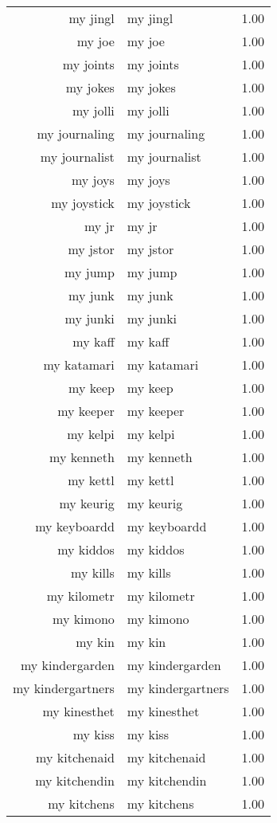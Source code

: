\begin{table}[ht]
\begin{tabular}{rlr}
  my jingl & my jingl & 1.00 \\ 
  my joe & my joe & 1.00 \\ 
  my joints & my joints & 1.00 \\ 
  my jokes & my jokes & 1.00 \\ 
  my jolli & my jolli & 1.00 \\ 
  my journaling & my journaling & 1.00 \\ 
  my journalist & my journalist & 1.00 \\ 
  my joys & my joys & 1.00 \\ 
  my joystick & my joystick & 1.00 \\ 
  my jr & my jr & 1.00 \\ 
  my jstor & my jstor & 1.00 \\ 
  my jump & my jump & 1.00 \\ 
  my junk & my junk & 1.00 \\ 
  my junki & my junki & 1.00 \\ 
  my kaff & my kaff & 1.00 \\ 
  my katamari & my katamari & 1.00 \\ 
  my keep & my keep & 1.00 \\ 
  my keeper & my keeper & 1.00 \\ 
  my kelpi & my kelpi & 1.00 \\ 
  my kenneth & my kenneth & 1.00 \\ 
  my kettl & my kettl & 1.00 \\ 
  my keurig & my keurig & 1.00 \\ 
  my keyboardd & my keyboardd & 1.00 \\ 
  my kiddos & my kiddos & 1.00 \\ 
  my kills & my kills & 1.00 \\ 
  my kilometr & my kilometr & 1.00 \\ 
  my kimono & my kimono & 1.00 \\ 
  my kin & my kin & 1.00 \\ 
  my kindergarden & my kindergarden & 1.00 \\ 
  my kindergartners & my kindergartners & 1.00 \\ 
  my kinesthet & my kinesthet & 1.00 \\ 
  my kiss & my kiss & 1.00 \\ 
  my kitchenaid & my kitchenaid & 1.00 \\ 
  my kitchendin & my kitchendin & 1.00 \\ 
  my kitchens & my kitchens & 1.00 \\ 

\end{tabular}
\end{table}
